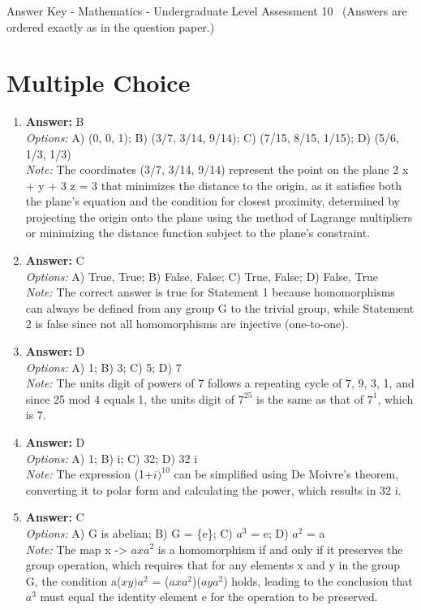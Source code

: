 \documentclass[12pt]{article}
\begin{document}
\begin{center}
Answer Key - Mathematics - Undergraduate Level Assessment 10 \
\small (Answers are ordered exactly as in the question paper.)
\end{center}

\section*{Multiple Choice}
\begin{enumerate}[label=\arabic*.]
\item \textbf{Answer:} B
\\ \textit{Options:} A) (0, 0, 1); B) (3/7, 3/14, 9/14); C) (7/15, 8/15, 1/15); D) (5/6, 1/3, 1/3)
\\ \textit{Note:} The coordinates (3/7, 3/14, 9/14) represent the point on the plane 2 x + y + 3 z = 3 that minimizes the distance to the origin, as it satisfies both the plane's equation and the condition for closest proximity, determined by projecting the origin onto the plane using the method of Lagrange multipliers or minimizing the distance function subject to the plane's constraint.
\item \textbf{Answer:} C
\\ \textit{Options:} A) True, True; B) False, False; C) True, False; D) False, True
\\ \textit{Note:} The correct answer is true for Statement 1 because homomorphisms can always be defined from any group G to the trivial group, while Statement 2 is false since not all homomorphisms are injective (one-to-one).
\item \textbf{Answer:} D
\\ \textit{Options:} A) 1; B) 3; C) 5; D) 7
\\ \textit{Note:} The units digit of powers of 7 follows a repeating cycle of 7, 9, 3, 1, and since 25 mod 4 equals 1, the units digit of $7^25$ is the same as that of $7^1$, which is 7.
\item \textbf{Answer:} D
\\ \textit{Options:} A) 1; B) i; C) 32; D) 32 i
\\ \textit{Note:} The expression (1+$i)^10$ can be simplified using De Moivre's theorem, converting it to polar form and calculating the power, which results in 32 i.
\item \textbf{Answer:} C
\\ \textit{Options:} A) G is abelian; B) G = \{e\}; C) $a^3$ = e; D) $a^2$ = a
\\ \textit{Note:} The map x -\textgreater{} $axa^2$ is a homomorphism if and only if it preserves the group operation, which requires that for any elements x and y in the group G, the condition a($xy)a^2$ = ($axa^2$)($aya^2$) holds, leading to the conclusion that $a^3$ must equal the identity element e for the operation to be preserved.
\end{enumerate}
\end{document}
